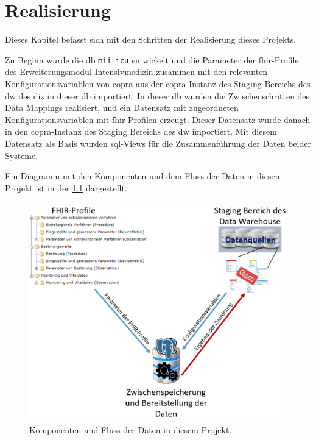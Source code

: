 \chapter{Realisierung} \label{ch:results}

Dieses Kapitel befasst sich mit den Schritten der Realisierung dieses Projekts.

Zu Beginn wurde die \ac{db} \texttt{mii\_icu} entwickelt und die Parameter der \ac{fhir}-Profile des Erweiterungsmodul \glqq Intensivmedizin\grqq{} zusammen mit den relevanten Konfigurationsvariablen von \ac{copra} aus der \ac{copra}-Instanz des Staging Bereichs des \ac{dw} des \ac{diz} in dieser \ac{db} importiert. In dieser \ac{db} wurden die Zwischenschritten des Data Mappings realisiert, und ein Datensatz mit zugeordneten Konfigurationsvariablen mit \ac{fhir}-Profilen erzeugt. Dieser Datensatz wurde danach in den \ac{copra}-Instanz des Staging Bereichs des \ac{dw} importiert. Mit diesem Datensatz als Basis wurden \ac{sql}-Views für die Zusammenführung der Daten beider Systeme.

Ein Diagramm mit den Komponenten und dem Fluss der Daten in diesem Projekt ist in der \ref{fig:components} dargestellt.

\clearpage

\begin{figure}[ht]
	\centering
	\includegraphics[height=9.5cm]{figures/master_diagram}
	\caption[Komponenten und Fluss der Daten] {Komponenten und Fluss der Daten in diesem Projekt.}
	\label{fig:components}
\end{figure}

